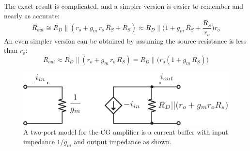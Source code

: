 The exact result is complicated, and a simpler version is easier to remember and nearly as accurate:
    \begin{equation} 
        R_{out} \cong R_D \parallel (r_o + g_m\,r_o\,R_S + R_S) \approx \boxed{R_D \parallel \bigg(1 + g_m\,R_S + \frac{R_S}{r_o}\bigg)r_o}
    \end{equation}
An even simpler version can be obtained by assuming the source resistance is less than $r_o$:
    \begin{equation} 
        R_{out} \approx R_D \parallel (r_o + g_m\,r_o\,R_S) = \boxed{R_D \parallel \Big(r_o(1 + g_m\,R_S)\Big)}
    \end{equation}
\begin{figure}[t]
\centering
\includegraphics[scale=1.5]{cg_model}
\caption{A two-port model for the CG amplifier is a current buffer with input impedance $1/g_m$ and output impedance as shown.}
\label{fig:cg_model}
\end{figure}
